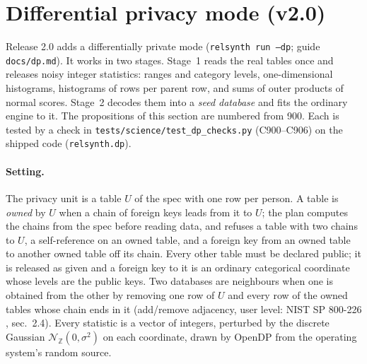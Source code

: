 \section{Differential privacy mode (v2.0)}\label{sec:v25dp}
\setcounter{savedpropdp}{\value{proposition}}
Release 2.0 adds a differentially private mode (\texttt{relsynth run --dp}; guide \texttt{docs/dp.md}). It works in two stages. Stage~1 reads the real tables once and releases noisy integer statistics: ranges and category levels, one-dimensional histograms, histograms of rows per parent row, and sums of outer products of normal scores. Stage~2 decodes them into a \emph{seed database} and fits the ordinary engine to it. The propositions of this section are numbered from 900. Each is tested by a check in \texttt{tests/science/test\_dp\_checks.py} (C900--C906) on the shipped code (\texttt{relsynth.dp}).

\paragraph{Setting.} The privacy unit is a table $U$ of the spec with one row per person. A table is \emph{owned} by $U$ when a chain of foreign keys leads from it to $U$; the plan computes the chains from the spec before reading data, and refuses a table with two chains to $U$, a self-reference on an owned table, and a foreign key from an owned table to another owned table off its chain. Every other table must be declared public; it is released as given and a foreign key to it is an ordinary categorical coordinate whose levels are the public keys. Two databases are neighbours when one is obtained from the other by removing one row of $U$ and every row of the owned tables whose chain ends in it (add/remove adjacency, user level: NIST SP 800-226 \cite{nist800226}, sec.~2.4). Every statistic is a vector of integers, perturbed by the discrete Gaussian $\mathcal{N}_\mathbb{Z}(0,\sigma^2)$ on each coordinate, drawn by OpenDP from the operating system's random source.


